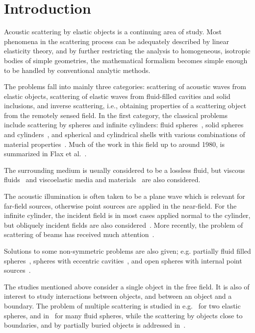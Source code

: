 \section{Introduction}
Acoustic scattering by elastic objects is a continuing area of study. Most phenomena in the scattering process can be adequately described by linear elasticity theory, and by further restricting the analysis to homogeneous, isotropic bodies of simple geometries, the mathematical formalism becomes simple enough to be handled by conventional analytic methods. 

The problems fall into mainly three categories: scattering of acoustic waves from elastic objects, scattering of elastic waves from fluid-filled cavities and solid inclusions, and inverse scattering, i.e., obtaining properties of a scattering object from the remotely sensed field. In the first category, the classical problems include scattering by spheres and infinite cylinders: fluid spheres~\cite{Anderson1950ssf}, solid spheres and cylinders~\cite{Faran1951ssb, Anderson1955soa, Hickling1962aoe, Doolittle1968ssb, Flax1978toe, Gaunaurd1983rao}, and spherical and cylindrical shells with various combinations of material properties~\cite{Hickling1964aoe, Doolittle1966ssb, Gaunaurd1987lac, Gaunaurd1991ssb, Kaduchak1998rbm, Chang1994voa, Chang1994soa, Fender1972sfa}. 
Much of the work in this field up to around 1980, is summarized in Flax et al.~\cite{Flax1981pa}.

The surrounding medium is usually considered to be a lossless fluid, but viscous fluids~\cite{Lin1983asb} and viscoelastic media and materials~\cite{Hasheminejad2005asf} are also considered. 

The acoustic illumination is often taken to be a plane wave which is relevant for far-field sources, otherwise point sources are applied in the near-field. For the infinite cylinder, the incident field is in most cases applied normal to the cylinder, but obliquely incident fields are also considered~\cite{Bao1990ras, Daneshjou2017aes}. More recently, the problem of scattering of beams has received much attention~\cite{Marston2007abs, Gong2016aso}. 

Solutions to some non-symmetric problems are also given; e.g. partially fluid filled spheres~\cite{Fawcett2001sfa}, spheres with eccentric cavities~\cite{Hasheminejad2005asf}, and open spheres with internal point sources~\cite{Elias1991sba}.

The studies mentioned above consider a single object in the free field. It is also of interest to study interactions between objects, and between an object and a boundary. The problem of multiple scattering is studied in e.g.~\cite{Gabrielli2001asb} for two elastic spheres, and in~\cite{Wu2006mso} for many fluid spheres, while the scattering by objects close to boundaries, and by  partially buried objects is addressed in~\cite{Zampolli2009bpf}.

